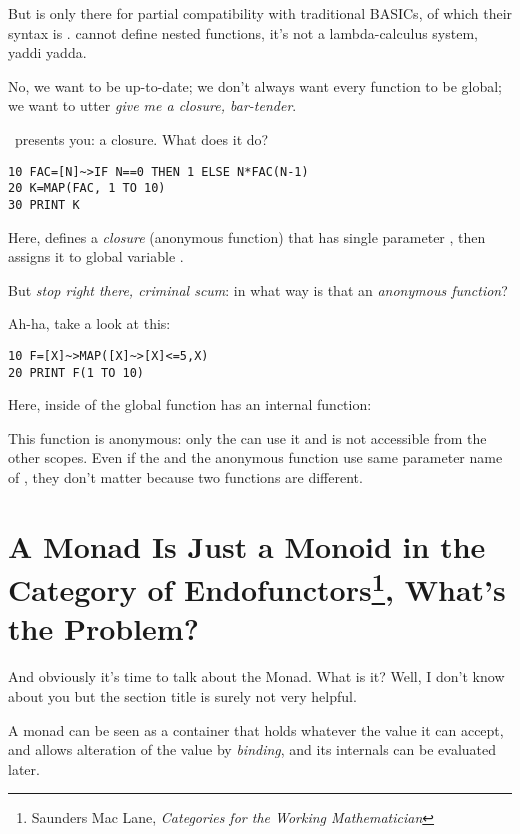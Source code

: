 But  is only there for partial compatibility with traditional BASICs, of which their syntax is .  cannot define nested functions, it's not a lambda-calculus system, yaddi yadda.

No, we want to be up-to-date; we don't always want every function to be global; we want to utter \emph{give me a closure, bar-tender}.

\tbas\ presents you: a closure. What does it do?

\begin{lstlisting}
10 FAC=[N]~>IF N==0 THEN 1 ELSE N*FAC(N-1)
20 K=MAP(FAC, 1 TO 10)
30 PRINT K
\end{lstlisting}

Here, \code{[N]\basicclosure\,\ldots} defines a \emph{closure} (anonymous function) that has single parameter , then assigns it to global variable .

But \emph{stop right there, criminal scum}: in what way is that an \emph{anonymous function}?

Ah-ha, take a look at this:

\begin{lstlisting}
10 F=[X]~>MAP([X]~>[X]<=5,X)
20 PRINT F(1 TO 10)
\end{lstlisting}

Here,  inside of the global function  has an internal function: 

This function is anonymous: only the  can use it and is not accessible from the other scopes. Even if the  and the anonymous function use same parameter name of , they don't matter because two functions are different.

\section[Monad]{A Monad Is Just a Monoid in the Category of Endofunctors\footnote{Saunders Mac Lane, \emph{Categories for the Working Mathematician}}, What's the Problem?}

And obviously it's time to talk about the Monad. What is it? Well, I don't know about you but the section title is surely not very helpful.

A monad can be seen as a container that holds whatever the value it can accept, and allows alteration of the value by \emph{binding}, and its internals can be evaluated later.

